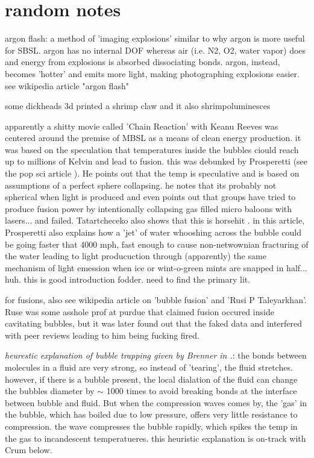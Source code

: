 \documentclass[rmp,aps,nofootinbib,superscriptaddress,floatfix]{revtex4-2}
\begin{document}
\newpage 

\section{random notes}

argon flash: a method of 'imaging explosions' similar to why argon is more useful for SBSL. argon has no internal DOF whereas air (i.e. N2, O2, water vapor) does and energy from explosions is absorbed dissociating bonds. argon, instead, becomes 'hotter' and emits more light, making photographing explosions easier. see wikipedia article "argon flash"



some dickheads 3d printed a shrimp claw and it also shrimpoluminesces \cite{tang2019bioinspired}

apparently a shitty movie called 'Chain Reaction' with Keanu Reeves was centered around the premise of MBSL as a means of clean energy production. it was based on the speculation that temperatures inside the bubbles ciould reach up to millions of Kelvin and lead to fusion. this was debunked by Prosperetti (see the pop sci article \cite{chainreaction}). He points out that the temp is speculative and is based on assumptions of a perfect sphere collapsing. he notes that its probably not spherical when light is produced and even points out that groups have tried to produce fusion power by intentionally collapsing gas filled micro baloons with lasers... and failed. Tatartcheceko also shows that this is horsehit \cite{tatartchenko2017sonoluminescence}. in this article, Prosperetti also explains how a 'jet' of water whooshing across the bubble could be going faster that 4000 mph, fast enough to cause non-netwownian fracturing of the water leading to light producuction through (apparently) the same mechanism of light emession when ice or wint-o-green mints are snapped in half... huh. this is good introduction fodder. need to find the primary lit. 

for fusions, also see wikipedia article on 'bubble fusion' and 'Rusi P Taleyarkhan'. Ruse was some asshole prof at purdue that claimed fusion occured inside cavitating bubbles, but it was later found out that the faked data and interfered with peer reviews leading to him being fucking fired.

\emph{heurestic explanation of bubble trapping given by Brenner in \cite{chainreaction}.}: the bonds between molecules in a fluid are very strong, so instead of 'tearing', the fluid stretches. however, if there is a bubble present, the local dialation of the fluid can change the bubbles diameter by $\sim$ 1000 times to avoid breaking bonds at the interface between bubble and fluid. But when the compression waves comes by, the 'gas' in the bubble, which has boiled due to low pressure, offers very little resistance to compression. the wave compresses the bubble rapidly, which spikes the temp in the gas to incandescent temperatueres. this heuristic explanation is on-track with Crum \cite{crum1994sonoluminescence} below.
\end{document}
